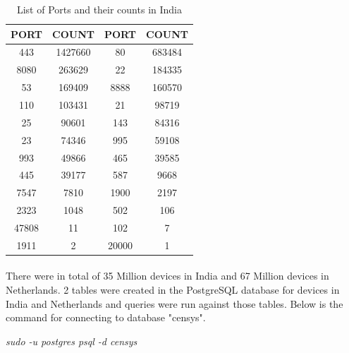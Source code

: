 \documentclass{report}
\begin{document}
\begin{table}[h!]
\begin{center}
\begin{tabular}{ |c|c|||||c|c| } 
 \hline
 \textbf{PORT} & \textbf{COUNT} & \textbf{PORT} & \textbf{COUNT}\\
 \hline
 443 & 1427660  & 80 & 683484\\
  \hline

8080 & 263629  & 22 & 184335\\
  \hline
 
 53 & 169409 & 8888 & 160570   \\
  \hline

 110 & 103431 & 21	 & 98719 \\
  \hline
 
 25 & 90601 &  143 & 84316 \\
  \hline
 
 23 & 74346 & 995 & 59108 \\
 \hline
 
 993 & 49866 & 465	 & 39585 \\
 \hline

 445 & 39177  & 587	 & 9668\\
 \hline

 7547 & 7810  & 1900 & 2197 \\
 \hline
 
  2323 & 1048  & 502 & 106 \\
 \hline
 
  47808 & 11  & 102 & 7 \\
 \hline
 
  1911 & 2  & 20000 & 1 \\
 \hline

\end{tabular}
\caption{List of Ports and their counts in India}
\end{center}
\end{table}

\paragraph{}
There were in total of 35 Million devices in India and 67 Million devices in Netherlands. 2 tables were created in the PostgreSQL database for devices in India and Netherlands and queries were run against those tables. Below is the command for connecting to database "censys".

\begin{center}
\textit{ sudo -u postgres psql -d censys}
\end{center}
\end{document}
